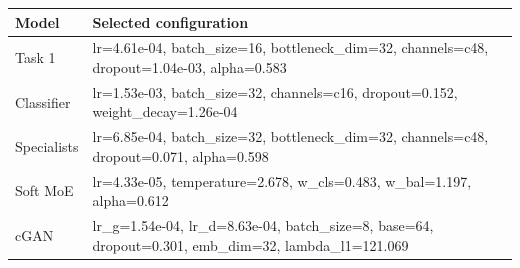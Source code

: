 \begin{tabular}{lp{6.3cm}}
\toprule
Model & Selected configuration \\
\midrule
Task 1 & lr=4.61e-04, batch\_size=16, bottleneck\_dim=32, channels=c48, dropout=1.04e-03, alpha=0.583 \\
Classifier & lr=1.53e-03, batch\_size=32, channels=c16, dropout=0.152, weight\_decay=1.26e-04 \\
Specialists & lr=6.85e-04, batch\_size=32, bottleneck\_dim=32, channels=c48, dropout=0.071, alpha=0.598 \\
Soft MoE & lr=4.33e-05, temperature=2.678, w\_cls=0.483, w\_bal=1.197, alpha=0.612 \\
cGAN & lr\_g=1.54e-04, lr\_d=8.63e-04, batch\_size=8, base=64, dropout=0.301, emb\_dim=32, lambda\_l1=121.069 \\
\bottomrule
\end{tabular}
